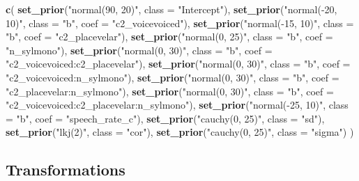 \documentclass[11pt,]{article}
\newenvironment{Shaded}{\begin{snugshade}}{\end{snugshade}}
\newcommand{\KeywordTok}[1]{\textcolor[rgb]{0.13,0.29,0.53}{\textbf{#1}}}
\newcommand{\DataTypeTok}[1]{\textcolor[rgb]{0.13,0.29,0.53}{#1}}
\newcommand{\StringTok}[1]{\textcolor[rgb]{0.31,0.60,0.02}{#1}}
\newcommand{\NormalTok}[1]{#1}
\begin{document}
\begin{Shaded}
\begin{Highlighting}[]
\KeywordTok{c}\NormalTok{(}
  \KeywordTok{set_prior}\NormalTok{(}\StringTok{"normal(90, 20)"}\NormalTok{, }\DataTypeTok{class =} \StringTok{"Intercept"}\NormalTok{),}
  \KeywordTok{set_prior}\NormalTok{(}\StringTok{"normal(-20, 10)"}\NormalTok{, }\DataTypeTok{class =} \StringTok{"b"}\NormalTok{, }\DataTypeTok{coef =} \StringTok{"c2_voicevoiced"}\NormalTok{),}
  \KeywordTok{set_prior}\NormalTok{(}\StringTok{"normal(-15, 10)"}\NormalTok{, }\DataTypeTok{class =} \StringTok{"b"}\NormalTok{, }\DataTypeTok{coef =} \StringTok{"c2_placevelar"}\NormalTok{),}
  \KeywordTok{set_prior}\NormalTok{(}\StringTok{"normal(0, 25)"}\NormalTok{, }\DataTypeTok{class =} \StringTok{"b"}\NormalTok{, }\DataTypeTok{coef =} \StringTok{"n_sylmono"}\NormalTok{),}
  \KeywordTok{set_prior}\NormalTok{(}\StringTok{"normal(0, 30)"}\NormalTok{, }\DataTypeTok{class =} \StringTok{"b"}\NormalTok{, }\DataTypeTok{coef =} \StringTok{"c2_voicevoiced:c2_placevelar"}\NormalTok{),}
  \KeywordTok{set_prior}\NormalTok{(}\StringTok{"normal(0, 30)"}\NormalTok{, }\DataTypeTok{class =} \StringTok{"b"}\NormalTok{, }\DataTypeTok{coef =} \StringTok{"c2_voicevoiced:n_sylmono"}\NormalTok{),}
  \KeywordTok{set_prior}\NormalTok{(}\StringTok{"normal(0, 30)"}\NormalTok{, }\DataTypeTok{class =} \StringTok{"b"}\NormalTok{, }\DataTypeTok{coef =} \StringTok{"c2_placevelar:n_sylmono"}\NormalTok{),}
  \KeywordTok{set_prior}\NormalTok{(}\StringTok{"normal(0, 30)"}\NormalTok{, }\DataTypeTok{class =} \StringTok{"b"}\NormalTok{, }\DataTypeTok{coef =} \StringTok{"c2_voicevoiced:c2_placevelar:n_sylmono"}\NormalTok{),}
  \KeywordTok{set_prior}\NormalTok{(}\StringTok{"normal(-25, 10)"}\NormalTok{, }\DataTypeTok{class =} \StringTok{"b"}\NormalTok{, }\DataTypeTok{coef =} \StringTok{"speech_rate_c"}\NormalTok{),}
  \KeywordTok{set_prior}\NormalTok{(}\StringTok{"cauchy(0, 25)"}\NormalTok{, }\DataTypeTok{class =} \StringTok{"sd"}\NormalTok{),}
  \KeywordTok{set_prior}\NormalTok{(}\StringTok{"lkj(2)"}\NormalTok{, }\DataTypeTok{class =} \StringTok{"cor"}\NormalTok{),}
  \KeywordTok{set_prior}\NormalTok{(}\StringTok{"cauchy(0, 25)"}\NormalTok{, }\DataTypeTok{class =} \StringTok{"sigma"}\NormalTok{)}
\NormalTok{)}
\end{Highlighting}
\end{Shaded}

\subsection{Transformations}\label{transformations}
\end{document}
